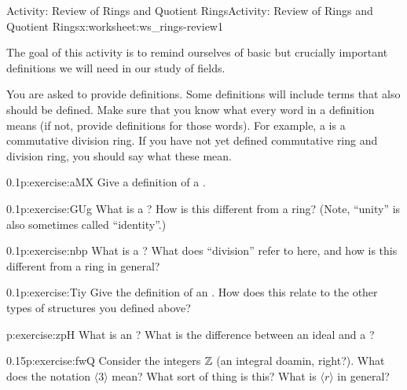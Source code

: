 \documentclass[11pt]{book}
\begin{document}
%
%
\typeout{************************************************}
\typeout{************************************************}
%
\begin{worksheet-subsection}{Activity: Review of Rings and Quotient Rings}{}{Activity: Review of Rings and Quotient Rings}{}{}{x:worksheet:ws_rings-review1}
\begin{introduction}{}%
The goal of this activity is to remind ourselves of basic but crucially important definitions we will need in our study of fields.%
\par
You are asked to provide definitions. Some definitions will include terms that also should be defined.  Make sure that you know what every word in a definition means (if not, provide definitions for those words).  For example, a  is a commutative division ring.  If you have not yet defined commutative ring and division ring, you should say what these mean.%
\end{introduction}%
\begin{divisionexercise}{1}{}{0.1}{p:exercise:aMX}%
Give a definition of a .%
\end{divisionexercise}%
\begin{divisionexercise}{2}{}{0.1}{p:exercise:GUg}%
What is a ?  How is this different from a ring?  (Note, ``unity'' is also sometimes called ``identity''.)%
\end{divisionexercise}%
\begin{divisionexercise}{3}{}{0.1}{p:exercise:nbp}%
What is a ?  What does ``division'' refer to here, and how is this different from a ring in general?%
\end{divisionexercise}%
\begin{divisionexercise}{4}{}{0.1}{p:exercise:Tiy}%
Give the definition of an .  How does this relate to the other types of structures you defined above?%
\end{divisionexercise}%
\begin{divisionexercise}{5}{}{}{p:exercise:zpH}%
What is an ?  What is the difference between an ideal and a ?%
\end{divisionexercise}%
\clearpage
\begin{divisionexercise}{6}{}{0.15}{p:exercise:fwQ}%
Consider the integers \(\mathbb{Z}\) (an integral doamin, right?).  What does the notation \(\langle 3 \rangle\) mean?  What sort of thing is this?  What is \(\langle r \rangle\) in general?%

\end{divisionexercise}
\end{worksheet-subsection}
\end{document}

